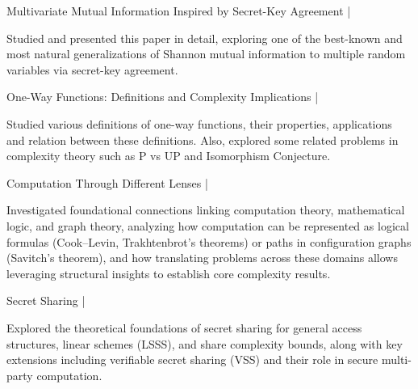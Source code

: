 
\begin{cventries}
  \cvproject
  {Multivariate Mutual Information Inspired by Secret-Key Agreement {\normalfont |} }
  {}
  {
    \begin{cvitems}
      \item {Studied and presented this paper in detail, exploring one of the best-known and most natural generalizations of Shannon mutual information to multiple random variables via secret-key agreement.}
    \end{cvitems}
  }
  \vspace{-5pt}

  \cvproject
  {One-Way Functions: Definitions and Complexity Implications {\normalfont |} }
  {}
  {
    \begin{cvitems}
      \item {Studied various definitions of one-way functions, their properties, applications and relation between these definitions. Also, explored some related problems in complexity theory such as P vs UP and Isomorphism Conjecture.}
    \end{cvitems}
  }
  \vspace{-5pt}

  \cvproject
  {Computation Through Different Lenses {\normalfont |} }
  {}
  {
    \begin{cvitems}
      \item {Investigated foundational connections linking computation theory, mathematical logic, and graph theory, analyzing how computation can be represented as logical formulas (Cook--Levin, Trakhtenbrot's theorems) or paths in configuration graphs (Savitch's theorem), and how translating problems across these domains allows leveraging structural insights to establish core complexity results.}
    \end{cvitems}
  }
  \vspace{-5pt}

  \cvproject
  {Secret Sharing {\normalfont |} }
  {}
  {
    \begin{cvitems}
      \item {Explored the theoretical foundations of secret sharing for general access structures, linear schemes (LSSS), and share complexity bounds, along with key extensions including verifiable secret sharing (VSS) and their role in secure multi-party computation.}
    \end{cvitems}
  }
  \vspace{-5pt}


\end{cventries}
